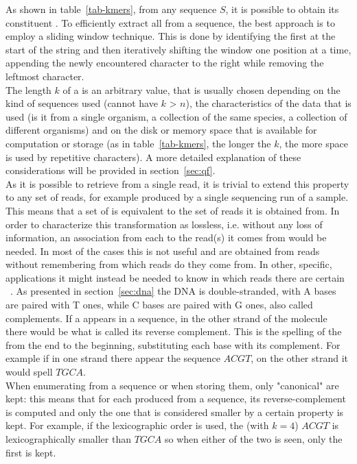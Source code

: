 As shown in table~\ref{tab-kmers}, from any sequence $S$, it is possible to obtain its constituent \kmers. To efficiently extract all \kmers from a sequence, the best approach is to employ a sliding window technique. This is done by identifying the first \kmer at the start of the string and then iteratively shifting the window one position at a time, appending the newly encountered character to the right while removing the leftmost character.\\ The length $k$ of a \kmer is an arbitrary value, that is usually chosen depending on the kind of sequences used (cannot have $k$ > $n$), the characteristics of the data that is used (is it from a single organism, a collection of the same species, a collection of different organisms) and on the disk or memory space that is available for computation or storage (as in table~\ref{tab-kmers}, the longer the $k$, the more space is used by repetitive characters). A more detailed explanation of these considerations will be provided in section~\ref{sec:qf}.\\
As it is possible to retrieve \kmers from a single read, it is trivial to extend this property to any set of reads, for example produced by a single sequencing run of a sample. This means that a set of \kmers is equivalent to the set of reads it is obtained from. In order to characterize this transformation as lossless, i.e. without any loss of information, an association from each \kmer to the read(s) it comes from would be needed. In most of the cases this is not useful and \kmers are obtained from reads without remembering from which reads do they come from. In other, specific, applications it might instead be needed to know in which reads there are certain \kmers~\cite{back_to_sequences}. %
As presented in section~\ref{sec:dna} the DNA is double-stranded, with A bases are paired with T ones, while C bases are paired with G ones, also called complements. If a \kmer appears in a sequence, in the other strand of the molecule there would be what is called its reverse complement. This is the spelling of the \kmer from the end to the beginning, substituting each base with its complement. For example if in one strand there appear the sequence $ACGT$, on the other strand it would spell $TGCA$.\\
When enumerating \kmers from a sequence or when storing them, only "canonical" \kmers are kept: this means that for each \kmer produced from a sequence, its reverse-complement is computed and only the one that is considered smaller by a certain property is kept. For example, if the lexicographic order is used, the \kmer (with $k=4$) $ACGT$ is lexicographically smaller than $TGCA$ so when either of the two is seen, only the first is kept.\\
